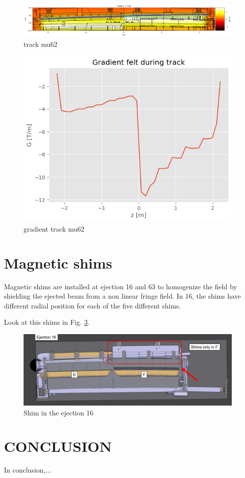 \documentclass[a4paper,
               biblatex,     %
               keeplastbox,   %
               ]{jacow}
\begin{document}
\begin{figure}[!htb]
   \centering
   \includegraphics*[width=\textwidth]{track_mu62.png}
   \caption{track mu62}
   \label{fig:track mu62}
\end{figure}

\begin{figure}[!htb]
   \centering
   \includegraphics*[width=1.0\columnwidth]{gradient_track_mu62.png}
   \caption{gradient track mu62}
   \label{fig:gradient track mu62}
\end{figure}


\section{Magnetic shims}

Magnetic shims are installed at ejection 16 and 63 to homogenize the field by shielding the ejected beam from a non linear fringe field. In 16, the shims have different radial position for each of the five different shims.

Look at this shims in Fig. \ref{fig:shim}.

\begin{figure}[!tbh]
    \centering
    \includegraphics*[width=\textwidth]{shim}
    \caption{Shim in the ejection 16}
    \label{fig:shim}
\end{figure}


\section{CONCLUSION}

In conclusion,...

\printbibliography
\end{document}
